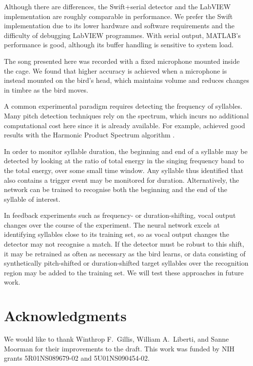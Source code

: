 \documentclass[10pt,letterpaper]{article}
\begin{document}
Although there are differences, the Swift+serial detector and the
LabVIEW implementation are roughly comparable in performance.  We
prefer the Swift implementation due to its lower hardware and software
requirements and the difficulty of debugging LabVIEW programmes.  With
serial output, MATLAB's performance is good, although its buffer
handling is sensitive to system load.

The song presented here was recorded with a fixed microphone mounted
inside the cage.  We found that higher accuracy is achieved when a
microphone is instead mounted on the bird's head, which maintains
volume and reduces changes in timbre as the bird moves.

A common experimental paradigm requires detecting the frequency of
syllables.  Many pitch detection techniques rely on the spectrum,
which incurs no additional computational cost here since it is already
available.  For example, \cite{Canopoli2014} achieved good results
with the Harmonic Product Spectrum algorithm
\cite{Noll1970pitchdetection}.

In order to monitor syllable duration, the beginning and end of a
syllable may be detected by looking at the ratio of total energy in
the singing frequency band to the total energy, over some small time
window.  Any syllable thus identified that also contains a trigger
event may be monitored for duration.  Alternatively, the network can
be trained to recognise both the beginning and the end of the syllable
of interest.

In feedback experiments such as frequency- or duration-shifting, vocal
output changes over the course of the experiment.  The neural network
excels at identifying syllables close to its training set, so as vocal
output changes the detector may not recognise a match.  If the
detector must be robust to this shift, it may be retrained as often as
necessary as the bird learns, or data consisting of synthetically
pitch-shifted or duration-shifted target syllables over the
recognition region may be added to the training set.  We will test
these approaches in future work.

\section{Acknowledgments}
We would like to thank Winthrop F.~Gillis, William A.~Liberti, and Sanne Moorman for
their improvements to the draft.  This work was funded by NIH grants
5R01NS089679-02 and 5U01NS090454-02.
\end{document}
